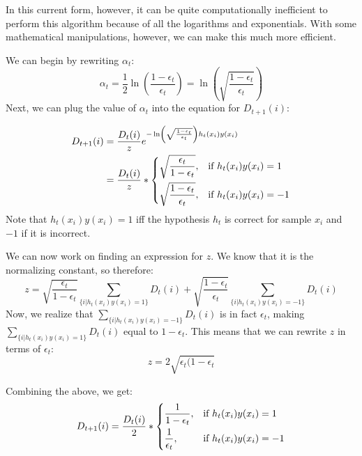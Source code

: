\documentclass{article}
\begin{document}
In this current form, however, it can be quite computationally inefficient to
perform this algorithm because of all the logarithms and exponentials. With
some mathematical manipulations, however, we can make this much more efficient.

We can begin by rewriting $\alpha_t$:
\begin{equation*}
    \alpha_t = \frac{1}{2}\ln\left(\frac{1 - \epsilon_t}{\epsilon_t}\right) = 
    \ln\left(\sqrt{\frac{1 - \epsilon_t}{\epsilon_t}}\right)
\end{equation*}
Next, we can plug the value of $\alpha_t$ into the equation for $D_{t+1}(i)$:

\begin{align*}
    D_{t+1}(i) &= \frac{D_{t}(i)}{z}e^{-\ln\left(\sqrt{\frac{1 -
    \epsilon_t}{\epsilon_t}}\right)h_t(x_i) y(x_i)} \\
    &= \frac{D_{t}(i)}{z} * \begin{dcases} 
        \sqrt{\frac{\epsilon_t}{1 - \epsilon_t}}, 
            & \text{if } h_t(x_i)y(x_i) = 1 \\ 
        \sqrt{\frac{1 - \epsilon_t}{\epsilon_t}},
            & \text{if } h_t(x_i)y(x_i) = -1
    \end{dcases}
\end{align*}
Note that $h_t(x_i)y(x_i) = 1$ iff the hypothesis $h_t$ is correct for sample
$x_i$ and $-1$ if it is incorrect.

We can now work on finding an expression for $z$. We know that it is the
normalizing constant, so therefore:
\begin{equation*}
    z = \sqrt{\frac{\epsilon_t}{1 - \epsilon_t}} \sum_{\{i | h_t(x_i)y(x_i) =
    1\}} D_t(i) + \sqrt{\frac{1 - \epsilon_t}{\epsilon_t}} 
    \sum_{\{i | h_t(x_i)y(x_i) = -1\}} D_t(i)
\end{equation*}
Now, we realize that $\sum_{\{i | h_t(x_i)y(x_i) = -1\}} D_t(i)$ is in fact
$\epsilon_t$, making $\sum_{\{i | h_t(x_i)y(x_i) = 1\}} D_t(i)$ equal to $1 -
\epsilon_t$. This means that we can rewrite $z$ in terms of $\epsilon_t$:
\begin{equation*}
    z = 2\sqrt{\epsilon_t (1 - \epsilon_t}
\end{equation*}

Combining the above, we get:
\begin{equation*}
    D_{t+1}(i) = \frac{D_t(i)}{2} * \begin{dcases}
        \frac{1}{1 - \epsilon_t}, & \text{if } h_t(x_i)y(x_i) = 1 \\ 
        \frac{1}{\epsilon_t}, & \text{if } h_t(x_i)y(x_i) = -1
    \end{dcases}
\end{equation*}
\end{document}
